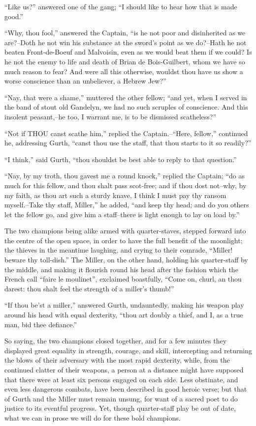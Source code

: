 ``Like us?'' answered one of the gang; ``I should like to hear how that
is made good.''

``Why, thou fool,'' answered the Captain, ``is he not poor and
disinherited as we are?--Doth he not win his substance at the sword's
point as we do?--Hath he not beaten Front-de-Boeuf and Malvoisin, even
as we would beat them if we could? Is he not the enemy to life and death
of Brian de Bois-Guilbert, whom we have so much reason to fear? And were
all this otherwise, wouldst thou have us show a worse conscience than an
unbeliever, a Hebrew Jew?''

``Nay, that were a shame,'' muttered the other fellow; ``and yet, when I
served in the band of stout old Gandelyn, we had no such scruples of
conscience. And this insolent peasant,--he too, I warrant me, is to be
dismissed scatheless?''

``Not if THOU canst scathe him,'' replied the Captain.--``Here,
fellow,'' continued he, addressing Gurth, ``canst thou use the staff,
that thou starts to it so readily?''

``I think,'' said Gurth, ``thou shouldst be best able to reply to that
question.''

``Nay, by my troth, thou gavest me a round knock,'' replied the Captain;
``do as much for this fellow, and thou shalt pass scot-free; and if thou
dost not--why, by my faith, as thou art such a sturdy knave, I think I
must pay thy ransom myself.--Take thy staff, Miller,'' he added, ``and
keep thy head; and do you others let the fellow go, and give him a
staff--there is light enough to lay on load by.''

The two champions being alike armed with quarter-staves, stepped forward
into the centre of the open space, in order to have the full benefit of
the moonlight; the thieves in the meantime laughing, and crying to their
comrade, ``Miller! beware thy toll-dish.'' The Miller, on the other
hand, holding his quarter-staff by the middle, and making it flourish
round his head after the fashion which the French call ``faire le
moulinet'', exclaimed boastfully, ``Come on, churl, an thou darest: thou
shalt feel the strength of a miller's thumb!''

``If thou be'st a miller,'' answered Gurth, undauntedly, making his
weapon play around his head with equal dexterity, ``thou art doubly a
thief, and I, as a true man, bid thee defiance.''

So saying, the two champions closed together, and for a few minutes they
displayed great equality in strength, courage, and skill, intercepting
and returning the blows of their adversary with the most rapid
dexterity, while, from the continued clatter of their weapons, a person
at a distance might have supposed that there were at least six persons
engaged on each side. Less obstinate, and even less dangerous combats,
have been described in good heroic verse; but that of Gurth and the
Miller must remain unsung, for want of a sacred poet to do justice to
its eventful progress. Yet, though quarter-staff play be out of date,
what we can in prose we will do for these bold champions.

